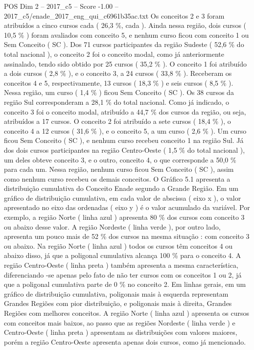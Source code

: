 \begin{textsample}{POS Dim 2 – 2017\_c5 – Score -1.00 – 2017\_c5/enade\_2017\_eng\_qui\_c6961b35ac.txt}
Os conceitos 2 e 3 foram atribuídos a cinco cursos cada ( 26,3 \%, cada ).
Ainda nessa região, dois cursos ( 10,5 \% ) foram avaliados com conceito 5, e nenhum curso ficou com conceito 1 ou Sem Conceito ( SC ).
Dos 71 cursos participantes da região Sudeste ( 52,6 \% do total nacional ), o conceito 2 foi o conceito modal, como já anteriormente assinalado, tendo sido obtido por 25 cursos ( 35,2 \% ).
O conceito 1 foi atribuído a dois cursos ( 2,8 \% ), e o conceito 3, a 24 cursos ( 33,8 \% ).
Receberam os conceitos 4 e 5, respectivamente, 13 cursos ( 18,3 \% ) e seis cursos ( 8,5 \% ).
Nessa região, um curso ( 1,4 \% ) ficou Sem Conceito ( SC ).
Os 38 cursos da região Sul corresponderam a 28,1 \% do total nacional.
Como já indicado, o conceito 3 foi o conceito modal, atribuído a 44,7 \% dos cursos da região, ou seja, atribuídos a 17 cursos.
O conceito 2 foi atribuído a sete cursos ( 18,4 \% ), o conceito 4 a 12 cursos ( 31,6 \% ), e o conceito 5, a um curso ( 2,6 \% ).
Um curso ficou Sem Conceito ( SC ), e nenhum curso recebeu conceito 1 na região Sul.
Já dos dois cursos participantes na região Centro-Oeste ( 1,5 \% do total nacional ), um deles obteve conceito 3, e o outro, conceito 4, o que corresponde a 50,0 \% para cada um.
Nessa região, nenhum curso ficou Sem Conceito ( SC ), assim como nenhum curso recebeu os demais conceitos.
O Gráfico 5.1 apresenta a distribuição cumulativa do Conceito Enade segundo a Grande Região.
Em um gráfico de distribuição cumulativa, em cada valor de abscissa ( eixo x ), o valor apresentado no eixo das ordenadas ( eixo y ) é o valor acumulado da variável.
Por exemplo, a região Norte ( linha azul ) apresenta 80 \% dos cursos com conceito 3 ou abaixo desse valor.
A região Nordeste ( linha verde ), por outro lado, apresenta um pouco mais de 52 \% dos cursos na mesma situação : com conceito 3 ou abaixo.
Na região Norte ( linha azul ) todos os cursos têm conceitos 4 ou abaixo disso, já que a poligonal cumulativa alcança 100 \% para o conceito 4.
A região Centro-Oeste ( linha preta ) também apresenta a mesma característica, diferenciando -se apenas pelo fato de não ter cursos com os conceitos 1 ou 2, já que a poligonal cumulativa parte de 0 \% no conceito 2.
Em linhas gerais, em um gráfico de distribuição cumulativa, poligonais mais à esquerda representam Grandes Regiões com pior distribuição, e poligonais mais à direita, Grandes Regiões com melhores conceitos.
A região Norte ( linha azul ) apresenta os cursos com conceitos mais baixos, ao passo que as regiões Nordeste ( linha verde ) e Centro-Oeste ( linha preta ) apresentam as distribuições com valores maiores, porém a região Centro-Oeste apresenta apenas dois cursos, como já mencionado.

\end{textsample}
